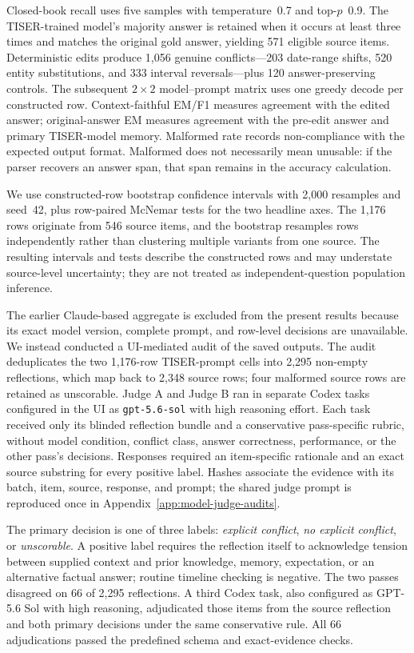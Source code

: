 \documentclass[conference]{IEEEtran}
\begin{document}
Closed-book recall uses five samples with temperature~0.7 and top-$p$~0.9. The TISER-trained model's majority answer is retained when it occurs at least three times and matches the original gold answer, yielding 571 eligible source items. Deterministic edits produce 1,056 genuine conflicts---203 date-range shifts, 520 entity substitutions, and 333 interval reversals---plus 120 answer-preserving controls. The subsequent $2\times2$ model--prompt matrix uses one greedy decode per constructed row. Context-faithful EM/F1 measures agreement with the edited answer; original-answer EM measures agreement with the pre-edit answer and primary TISER-model memory. Malformed rate records non-compliance with the expected output format. Malformed does not necessarily mean unusable: if the parser recovers an answer span, that span remains in the accuracy calculation.

We use constructed-row bootstrap confidence intervals with 2,000 resamples and seed~42, plus row-paired McNemar tests for the two headline axes. The 1,176 rows originate from 546 source items, and the bootstrap resamples rows independently rather than clustering multiple variants from one source. The resulting intervals and tests describe the constructed rows and may understate source-level uncertainty; they are not treated as independent-question population inference.

The earlier Claude-based aggregate is excluded from the present results because its exact model version, complete prompt, and row-level decisions are unavailable. We instead conducted a UI-mediated audit of the saved outputs. The audit deduplicates the two 1,176-row TISER-prompt cells into 2,295 non-empty reflections, which map back to 2,348 source rows; four malformed source rows are retained as unscorable. Judge A and Judge B ran in separate Codex tasks configured in the UI as \texttt{gpt-5.6-sol} with high reasoning effort. Each task received only its blinded reflection bundle and a conservative pass-specific rubric, without model condition, conflict class, answer correctness, performance, or the other pass's decisions. Responses required an item-specific rationale and an exact source substring for every positive label. Hashes associate the evidence with its batch, item, source, response, and prompt; the shared judge prompt is reproduced once in Appendix~\ref{app:model-judge-audits}.

The primary decision is one of three labels: \emph{explicit conflict}, \emph{no explicit conflict}, or \emph{unscorable}. A positive label requires the reflection itself to acknowledge tension between supplied context and prior knowledge, memory, expectation, or an alternative factual answer; routine timeline checking is negative. The two passes disagreed on 66 of 2,295 reflections. A third Codex task, also configured as GPT-5.6 Sol with high reasoning, adjudicated those items from the source reflection and both primary decisions under the same conservative rule. All 66 adjudications passed the predefined schema and exact-evidence checks.
\end{document}
